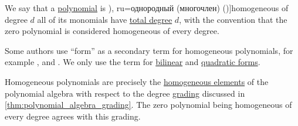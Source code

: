 \begin{definition}\label{def:homogeneous_polynomial}
  We say that a \hyperref[def:polynomial_algebra]{polynomial} is \term[bg=хомогенен (полином) (\cite[58]{ГеновМиховскиМоллов1991Алгебра}), ru=однородный (многочлен) (\cite[314]{Курош1968КурсВысшейАлгебры})]{homogeneous} of degree \( d \) all of its monomials have \hyperref[def:polynomial_degree]{total degree} \( d \), with the convention that the zero polynomial is considered homogeneous of every degree.
\end{definition}
\begin{comments}
  \item Some authors use \enquote{form} as a secondary term for homogeneous polynomials, for example ,  and . We only use the term for \hyperref[def:bilinear_form]{bilinear} and \hyperref[def:quadratic_form]{quadratic forms}.

  \item Homogeneous polynomials are precisely the \hyperref[def:homogeneous_element]{homogeneous elements} of the polynomial algebra with respect to the degree \hyperref[def:graded_ring]{grading} discussed in \cref{thm:polynomial_algebra_grading}. The zero polynomial being homogeneous of every degree agrees with this grading.
\end{comments}

